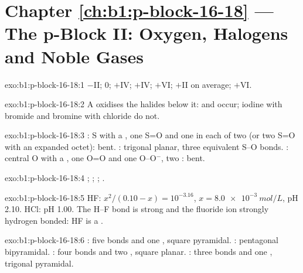 \section*{Chapter \ref{ch:b1:p-block-16-18} --- The p-Block II: Oxygen, Halogens and Noble Gases}

\begin{solution}{exo:b1:p-block-16-18:1}
 $-$II;  0;  $+$IV;  $+$IV; 
$+$VI;  $+$II on average;  $+$VI.
\end{solution}

\begin{solution}{exo:b1:p-block-16-18:2}
A  oxidises the halides below it:  and
 occur; iodine with bromide and bromine with
chloride do not.
\end{solution}

\begin{solution}{exo:b1:p-block-16-18:3}
: S with a , one S=O and one  in each of two
 (or two S=O with an expanded octet): bent.
: trigonal planar, three equivalent S--O bonds. : central O
with a , one O=O and one O--O$^-$, two : bent.
\end{solution}

\begin{solution}{exo:b1:p-block-16-18:4}
; ;
; .
\end{solution}

\begin{solution}{exo:b1:p-block-16-18:5}
HF: $x^2/(0.10 - x) = 10^{-3.16}$, $x = \qty{8.0e-3}{mol/L}$, pH 2.10. HCl:
pH 1.00. The H--F bond is strong and the fluoride ion strongly hydrogen
bonded: HF is a .
\end{solution}

\begin{solution}{exo:b1:p-block-16-18:6}
: five bonds and one , square pyramidal. :
pentagonal bipyramidal. : four bonds and two , square
planar. : three bonds and one , trigonal pyramidal.
\end{solution}

